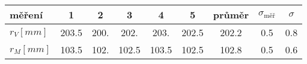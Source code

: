 \begin{tabular}{
    l
    S[table-format=3.1]
    S[table-format=3.1]
    S[table-format=3.1]
    S[table-format=3.1]
    S[table-format=3.1]
    S[table-format=3.1]
    S[table-format=1.1]
    S[table-format=0.1]
} \toprule
měření         & {1}   & {2}  & {3}   & {4}   & {5}   & {průměr} & {$\sigma_\text{měř}$} & {$\sigma$} \\ \midrule
$r_V[\si{mm}]$ & 203.5 & 200. & 202.  & 203.  & 202.5 & 202.2    & 0.5                   & 0.8        \\
$r_M[\si{mm}]$ & 103.5 & 102. & 102.5 & 103.5 & 102.5 & 102.8    & 0.5                   & 0.6        \\ \bottomrule

\end{tabular} 